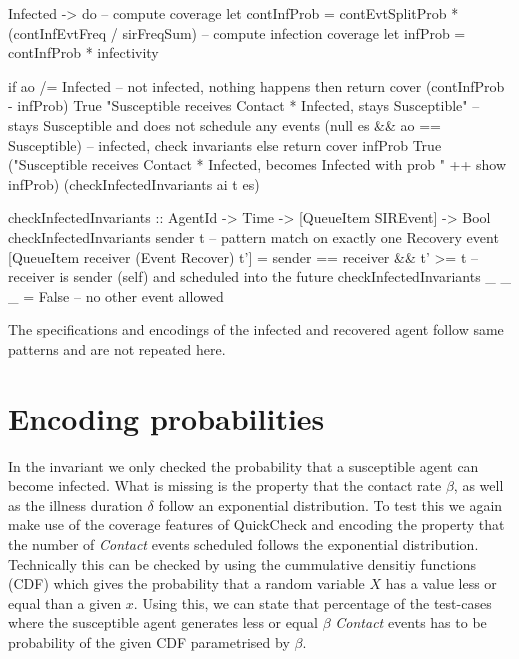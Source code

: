 \begin{HaskellCode}
Infected -> do
  -- compute coverage
  let contInfProb = contEvtSplitProb * (contInfEvtFreq / sirFreqSum)
  -- compute infection coverage
  let infProb = contInfProb * infectivity

  if ao /= Infected
    -- not infected, nothing happens
    then return
          cover (contInfProb - infProb) True "Susceptible receives Contact * Infected, stays Susceptible"
            -- stays Susceptible and does not schedule any events 
            (null es && ao == Susceptible) 
    -- infected, check invariants
    else return 
          cover infProb True ("Susceptible receives Contact * Infected, becomes Infected with prob " ++ show infProb)
            (checkInfectedInvariants ai t es)
            
checkInfectedInvariants :: AgentId -> Time -> [QueueItem SIREvent] -> Bool
checkInfectedInvariants sender t 
    -- pattern match on exactly one Recovery event
    [QueueItem receiver (Event Recover) t'] 
  = sender == receiver && t' >= t           -- receiver is sender (self) and scheduled into the future
checkInfectedInvariants _ _ _ = False       -- no other event allowed
\end{HaskellCode}

The specifications and encodings of the infected and recovered agent follow same patterns and are not repeated here.

\section{Encoding probabilities}
In the invariant we only checked the probability that a susceptible agent can become infected. What is missing is the property that the contact rate $\beta$, as well as the illness duration $\delta$ follow an exponential distribution. To test this we again make use of the coverage features of QuickCheck and encoding the property that the number of \textit{Contact} events scheduled follows the exponential distribution. Technically this can be checked by using the cummulative densitiy functions (CDF) which gives the probability that a random variable $X$ has a value less or equal than a given $x$. Using this, we can state that percentage of the test-cases where the susceptible agent generates less or equal $\beta$ \textit{Contact} events has to be probability of the given CDF parametrised by $\beta$.

